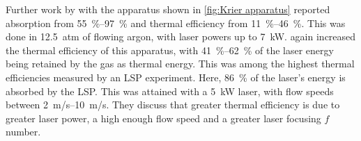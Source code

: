         Further work by \textcite{zerkleLasersustainedArgonPlasmas1990} with the apparatus shown in \autoref{fig:Krier apparatus} reported absorption from \qtyrange{55}{97}{\%} and thermal efficiency from \qtyrange{11}{46}{\%}. This was done in \qtylist{1 2.5}{atm} of flowing argon, with laser powers up to \qty{7}{kW}. \textcite{chenEmissionSpectroscopyCw1989a} again increased the thermal efficiency of this apparatus, with \qtyrange{41}{62}{\%} of the laser energy being retained by the gas as thermal energy. This was among the highest thermal efficiencies measured by an LSP experiment. Here, \qty{86}{\%} of the laser's energy is absorbed by the LSP. This was attained with a \qty{5}{kW}  laser, with flow speeds between \qtyrange{2}{10}{m/s}. They discuss that greater thermal efficiency is due to greater laser power, a high enough flow speed and a greater laser focusing $f$ number.

